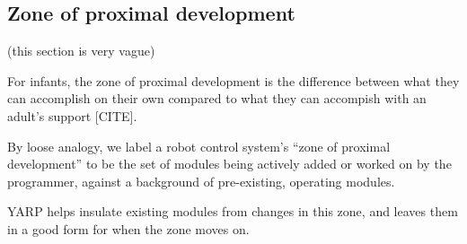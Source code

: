 \subsection*{Zone of proximal development}

(this section is very vague)

For infants, the zone of proximal development is the
difference between what they can accomplish on their
own compared to what they can accompish with an
adult's support [CITE].

By loose analogy, we label a robot control system's ``zone of proximal
development'' to be the set of modules being actively added or worked
on by the programmer, against a background of pre-existing, operating
modules.  

YARP helps insulate existing modules from changes in this zone,
and leaves them in a good form for when the zone moves on.
